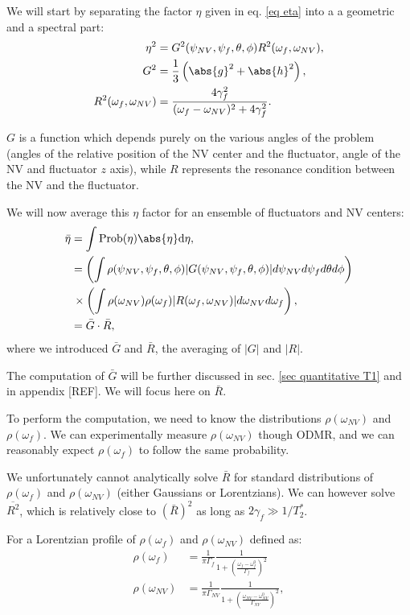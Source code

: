 \documentclass[a4paper,11pt]{report}
\begin{document}
We will start by separating the factor $\eta$ given in eq. \ref{eq eta} into a a geometric and a spectral part:
\begin{align}
\eta^2&=G^2(\psi_{NV},\psi_f,\theta,\phi) R^2(\omega_f,\omega_{NV}), \\
G^2&=\frac{1}{3}\left(\abs{g}^2+\abs{h}^2 \right),  \\ 
R^2(\omega_f,\omega_{NV}) &= \frac{4\gamma_f^2}{(\omega_f - \omega_{NV})^2+4\gamma_f^2}.
\end{align}

$G$ is a function which depends purely on the various angles of the problem (angles of the relative position of the NV center and the fluctuator, angle of the NV and fluctuator $z$ axis), while $R$ represents the resonance condition between the NV and the fluctuator.

We will now average this $\eta$ factor for an ensemble of fluctuators and NV centers:
\begin{align*}
\bar \eta &= \int \rm{Prob}(\eta) \abs{\eta} d\eta, \\
&= \left(\int \rho(\psi_{NV},\psi_f,\theta,\phi) |G(\psi_{NV},\psi_f,\theta,\phi)| d\psi_{NV} d\psi_f d\theta d\phi \right) \\
&\, \times \left( \int \rho(\omega_{NV}) \rho(\omega_{f}) |R(\omega_f,\omega_{NV})| d\omega_{NV} d\omega_{f} \right), \\
&= \bar G \cdot \bar R,
\end{align*}
where we introduced $\bar G$ and $\bar R$, the averaging of $|G|$ and $|R|$.

The computation of $\bar G$ will be further discussed in sec. \ref{sec quantitative T1} and in appendix [REF]. We will focus here on $\bar R$.

To perform the computation, we need to know the distributions $\rho(\omega_{NV})$ and $\rho(\omega_{f})$. We can experimentally measure $\rho(\omega_{NV})$ though ODMR, and we can reasonably expect $\rho(\omega_{f})$ to follow the same probability.

We unfortunately cannot analytically solve $\bar R$ for standard distributions of $\rho(\omega_{f})$ and $\rho(\omega_{NV})$ (either Gaussians or Lorentzians). We can however solve $\overline{R^2}$, which is relatively close to $(\bar{R})^2$ as long as $2 \gamma_f \gg 1/T_2^*$.

For a Lorentzian profile of $\rho(\omega_{f})$ and $\rho(\omega_{NV})$ defined as:
\begin{align*}
\rho(\omega_{f})&=\frac{1}{\pi \Gamma_f} \frac{1}{1+ \left(\frac{\omega_f-\omega^0_f}{\Gamma_f}\right)^2} \\
\rho(\omega_{NV})&=\frac{1}{\pi \Gamma_{NV}} \frac{1}{1+ \left(\frac{\omega_{NV}-\omega^0_{NV}}{\Gamma_{NV}}\right)^2},
\end{align*}
\end{document}
